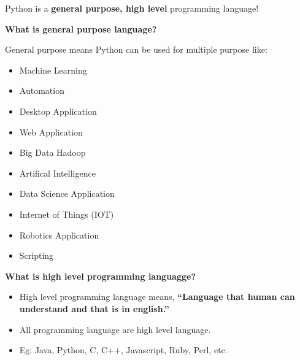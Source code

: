 
\begin{flushleft}
	
	\bigskip
	
	Python is a \textbf{general purpose, high level} programming language!
	
	\bigskip
	\textbf{What is general purpose language?}
	
	General purpose means Python can be used for multiple purpose like:
	\begin{itemize}
		\item Machine Learning
		\item Automation
		\item Desktop Application
		\item Web Application
		\item Big Data Hadoop
		\item Artifical Intelligence
		\item Data Science Application
		\item Internet of Things (IOT)
		\item Robotics Application
		\item Scripting
	\end{itemize}

	\bigskip
	\textbf{What is high level programming languagge?}
	\begin{itemize}
		\item High level programming language means,
\textbf{“Language that human can understand and that is in english.”}
		\item All programming language are high level language. 
		\item Eg: Java, Python, C, C++, Javascript, Ruby, Perl, etc.
	\end{itemize}
	
	
	
\end{flushleft}

\newpage



